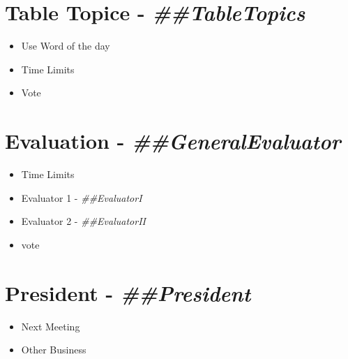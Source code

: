 \documentclass{article}
\newcommand{\president}{##President}
\newcommand{\tableTopics}{##TableTopics}
\newcommand{\generalEvaluator}{##GeneralEvaluator}
\newcommand{\evaluatorI}{##EvaluatorI}
\newcommand{\evaluatorII}{##EvaluatorII}
\begin{document}
\begin{spacing}{.6}
\section*{Table Topice - \textit{\tableTopics{}}} 
\begin{itemize}
 \item Use Word of the day
 \item Time Limits
 \item Vote
\end{itemize}

\section*{Evaluation - \textit{\generalEvaluator{}}} 
\begin{itemize}
  \item Time Limits
  \item Evaluator 1 - \textit{\evaluatorI{}}
  \item Evaluator 2 - \textit{\evaluatorII{}}
  \item vote
\end{itemize}

\section*{President - \textit{\president{}}} 
\begin{itemize}
  \item Next Meeting
  \item Other Business
\end{itemize}

\end{spacing}
\end{document}
